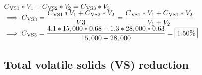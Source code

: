 \begin{enumerate}
                    $
                    C\textsubscript{VS1}*V_1 + C\textsubscript{VS2}*V_2 = C\textsubscript{VS3}*V_3$\\                    \vspace{0.3cm}
                    $\implies C\textsubscript{VS3} = \dfrac{C\textsubscript{VS1}*V_1 + C\textsubscript{VS2}*V_2}{V3}=\dfrac{C\textsubscript{VS1}*V_1 + C\textsubscript{VS1}*V_2}{V_1 + V_2}$\\
                                        \vspace{0.3cm}
                    $\implies C\textsubscript{VS3}
                    =\dfrac{4.1*15,000*0.68 + 1.3*28,000*0.63}{15,000 + 28,000}=\boxed{1.50\%}$
                    \\
                \end{enumerate}
 \subsection{Total volatile solids (VS) reduction}    

